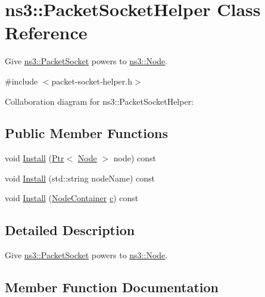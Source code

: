 \hypertarget{classns3_1_1PacketSocketHelper}{}\section{ns3\+:\+:Packet\+Socket\+Helper Class Reference}
\label{classns3_1_1PacketSocketHelper}


Give \hyperlink{classns3_1_1PacketSocket}{ns3\+::\+Packet\+Socket} powers to \hyperlink{classns3_1_1Node}{ns3\+::\+Node}.  




{\ttfamily \#include $<$packet-\/socket-\/helper.\+h$>$}



Collaboration diagram for ns3\+:\+:Packet\+Socket\+Helper\+:
\subsection*{Public Member Functions}
\begin{DoxyCompactItemize}
\item 
void \hyperlink{classns3_1_1PacketSocketHelper_a33f449fee7fd10411949d17feba6d33e}{Install} (\hyperlink{classns3_1_1Ptr}{Ptr}$<$ \hyperlink{classns3_1_1Node}{Node} $>$ node) const 
\item 
void \hyperlink{classns3_1_1PacketSocketHelper_adfc14022fa4bc85a127f855b862c678c}{Install} (std\+::string node\+Name) const 
\item 
void \hyperlink{classns3_1_1PacketSocketHelper_a2a077567e81b938c5e1f7258f0709346}{Install} (\hyperlink{classns3_1_1NodeContainer}{Node\+Container} \hyperlink{mmwave_2model_2fading-traces_2fading__trace__generator_8m_ae0323a9039add2978bf5b49550572c7c}{c}) const 
\end{DoxyCompactItemize}


\subsection{Detailed Description}
Give \hyperlink{classns3_1_1PacketSocket}{ns3\+::\+Packet\+Socket} powers to \hyperlink{classns3_1_1Node}{ns3\+::\+Node}. 

\subsection{Member Function Documentation}
